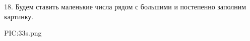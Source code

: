 18. Будем ставить маленькие числа рядом с большими и постепенно заполним картинку.
\begin{center}
{{PIC:33s.png}}
\end{center}
